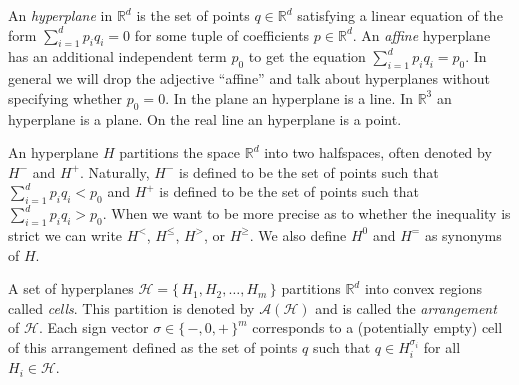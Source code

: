 An \emph{hyperplane} in \(\mathbb{R}^d\) is the set of points \(q \in \mathbb{R}^d\)
satisfying a linear equation of the form \(\sum_{i=1}^{d} p_i q_i = 0\) for
some tuple of coefficients \(p \in \mathbb{R}^d\). An \emph{affine} hyperplane has an
additional independent term \(p_0\) to get the equation \(\sum_{i=1}^{d}
p_i q_i = p_0\). In general we will drop the adjective ``affine'' and talk about
hyperplanes without specifying whether \(p_0 = 0\).
%
In the plane an hyperplane is a line. In \(\mathbb{R}^3\) an hyperplane is
a plane. On the real line an hyperplane is a point.

An hyperplane \(H\) partitions the space \(\mathbb{R}^d\) into two halfspaces,
often denoted by \(H^-\) and \(H^+\).
Naturally, \(H^-\) is defined to be the set of points such that
\(\sum_{i=1}^{d} p_i q_i < p_0 \) and \(H^+\) is defined to be the set of
points such that \(\sum_{i=1}^{d} p_i q_i > p_0 \). When we want to be more
precise as to whether the inequality is strict we can write \(H^{<}\),
\(H^{\leq}\), \(H^{>}\), or \(H^{\geq}\).
We also define \(H^0\) and \(H^{=}\) as synonyms of \(H\).

A set of hyperplanes \(\mathcal{H} = \{\, H_1, H_2, \ldots, H_m\,\}\)
partitions \(\mathbb{R}^d\) into convex regions called \emph{cells}.
%
This partition is denoted by \(\mathcal{A}(\mathcal{H})\) and is called the
\emph{arrangement} of \(\mathcal{H}\).
%
Each sign vector \(\sigma \in {\{\,-,0,+\,\}}^{m}\) corresponds to a
(potentially empty) cell of this arrangement defined as the set of points \(q\)
such that \(q \in H_i^{\sigma_i}\) for all \(H_i \in \mathcal{H}\).












